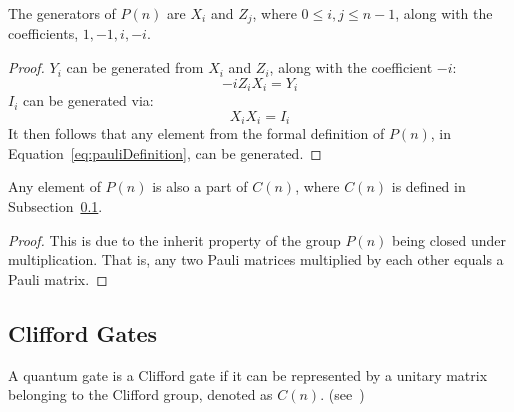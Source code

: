 \begin{theorem}
\label{theorem:pauliGenerators}
The generators of $P(n)$ are $X_i$ and $Z_j$, where $0 \leq i, j \leq n-1$, along with the coefficients, $1,-1,i,-i$.
\end{theorem}
\begin{proof}
$Y_i$ can be generated from $X_i$ and $Z_i$, along with the coefficient $-i$:
$$-iZ_iX_i = Y_i$$
$I_i$ can be generated via:
$$X_iX_i = I_i$$
It then follows that any element from the formal definition of $P(n)$, in Equation~\eqref{eq:pauliDefinition}, can be generated.
\end{proof}

\begin{theorem}
\label{theorem:paulisAreCliffords}
Any element of $P(n)$ is also a part of $C(n)$, where $C(n)$ is defined in Subsection~\ref{subsubsection:Clifford}.
\end{theorem}
\begin{proof}
This is due to the inherit property of the group $P(n)$ being closed under multiplication. That is, any two Pauli matrices multiplied by each other equals a Pauli matrix.
\end{proof}

\subsection{Clifford Gates}
\label{subsubsection:Clifford}
A quantum gate is a Clifford gate if it can be represented by a unitary matrix belonging to the Clifford group, denoted as $C(n)$. (see~\cite{gottesman1997stabilizer})

